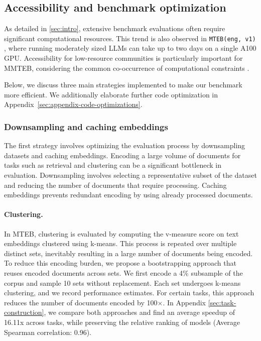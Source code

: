 \subsection{Accessibility and benchmark optimization}
\label{sec:benchmark-optimization}

As detailed in \autoref{sec:intro}, extensive benchmark evaluations often require significant computational resources. This trend is also observed in \texttt{MTEB(eng, v1)} \citep{muennighoff2023mteb}, where running moderately sized LLMs can take up to two days on a single A100 GPU. Accessibility for low-resource communities is particularly important for MMTEB, considering the common co-occurrence of computational constraints \citep{ahia-etal-2021-low-resource}. 

Below, we discuss three main strategies implemented to make our benchmark more efficient.  We additionally elaborate further code optimization in Appendix~\ref{sec:appendix-code-optimizations}.

\subsubsection{Downsampling and caching embeddings} 
The first strategy involves optimizing the evaluation process by downsampling datasets and caching embeddings. Encoding a large volume of documents for tasks such as retrieval and clustering can be a significant bottleneck in evaluation. Downsampling involves selecting a representative subset of the dataset and reducing the number of documents that require processing. Caching embeddings prevents redundant encoding by using already processed documents.

\paragraph{Clustering.} In MTEB, clustering is evaluated by computing the v-measure score \citep{rosenberg-hirschberg-2007-v} on text embeddings clustered using k-means. This process is repeated over multiple distinct sets, inevitably resulting in a large number of documents being encoded. To reduce this encoding burden, we propose a bootstrapping approach that reuses encoded documents across sets. We first encode a 4\% subsample of the corpus and sample 10 sets without replacement. Each set undergoes k-means clustering, and we record performance estimates. For certain tasks, this approach reduces the number of documents encoded by 100$\times$. In Appendix \ref{sec:task-construction}, we compare both approaches and find an average speedup of 16.11x across tasks, while preserving the relative ranking of models (Average Spearman correlation: 0.96).

